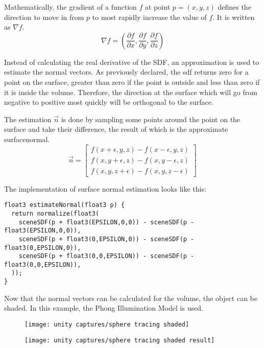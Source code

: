 \noindent
Mathematically, the \gls{gradient} of a function $f$ at point $p=(x,y,z)$ defines the direction to move in from $p$ to most rapidly increase the value of $f$. 
It is written as $\nabla f$.
$$
\nabla f = \left( \frac{\partial f}{\partial x}, \frac{\partial f}{\partial y}, \frac{\partial f}{\partial z} \right)
$$

\noindent
Instead of calculating the real derivative of the SDF, an approximation is used to estimate the normal vectors.
As previously declared, the \gls{sdf} returns zero for a point on the surface, greater than zero if the point is outside and less than zero if it is inside the volume. 
Therefore, the direction at the surface which will go from negative to positive most quickly will be orthogonal to the surface.
\\
\begin{minipage}{\linewidth}
The estimation $\overrightarrow{n}$ is done by sampling some points around the point on the surface and take their difference, the result of which is the approximate \gls{surfacenormal}.
$$
\overrightarrow{n} = 
\left[
    \begin{matrix}
        f(x + \epsilon, y, z) - f(x - \epsilon, y, z) \\
        f(x, y + \epsilon, z) - f(x, y - \epsilon, z) \\
        f(x, y, z + \epsilon) - f(x, y, z - \epsilon)
       \end{matrix}
\right]
$$

\noindent
The implementation of surface normal estimation looks like this:

\begin{lstlisting}[language=HLSL, caption=Implementation of surface normal estimation., label=lst:shader:surfacenormal]
float3 estimateNormal(float3 p) {
  return normalize(float3(
    sceneSDF(p + float3(EPSILON,0,0)) - sceneSDF(p - float3(EPSILON,0,0)),
    sceneSDF(p + float3(0,EPSILON,0)) - sceneSDF(p - float3(0,EPSILON,0)),
    sceneSDF(p + float3(0,0,EPSILON)) - sceneSDF(p - float3(0,0,EPSILON)),
  ));
}
\end{lstlisting}
\end{minipage}

\noindent
Now that the normal vectors can be calculated for the volume, the object can be shaded. In this example, the Phong Illumination Model \cite{online:phong} is used. 

\begin{figure}[H]
    \centering
        \begin{minipage}{0.47\linewidth}
            \texttt{[image: unity captures/sphere tracing shaded]}
            \label{img:captures:spheretracing}
        \end{minipage}
    \hfill
        \begin{minipage}{0.47\linewidth}
            \texttt{[image: unity captures/sphere tracing shaded result]}
            \label{img:captures:spheretracing_rendered}
        \end{minipage}
\end{figure}

